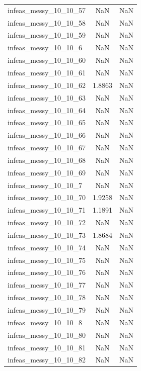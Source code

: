 \begin{longtable}{lcc}
infeas\_messy\_10\_10\_57  &      NaN &     NaN \\
infeas\_messy\_10\_10\_58  &      NaN &     NaN \\
infeas\_messy\_10\_10\_59  &      NaN &     NaN \\
infeas\_messy\_10\_10\_6   &      NaN &     NaN \\
infeas\_messy\_10\_10\_60  &      NaN &     NaN \\
infeas\_messy\_10\_10\_61  &      NaN &     NaN \\
infeas\_messy\_10\_10\_62  &   1.8863 &     NaN \\
infeas\_messy\_10\_10\_63  &      NaN &     NaN \\
infeas\_messy\_10\_10\_64  &      NaN &     NaN \\
infeas\_messy\_10\_10\_65  &      NaN &     NaN \\
infeas\_messy\_10\_10\_66  &      NaN &     NaN \\
infeas\_messy\_10\_10\_67  &      NaN &     NaN \\
infeas\_messy\_10\_10\_68  &      NaN &     NaN \\
infeas\_messy\_10\_10\_69  &      NaN &     NaN \\
infeas\_messy\_10\_10\_7   &      NaN &     NaN \\
infeas\_messy\_10\_10\_70  &   1.9258 &     NaN \\
infeas\_messy\_10\_10\_71  &   1.1891 &     NaN \\
infeas\_messy\_10\_10\_72  &      NaN &     NaN \\
infeas\_messy\_10\_10\_73  &   1.8684 &     NaN \\
infeas\_messy\_10\_10\_74  &      NaN &     NaN \\
infeas\_messy\_10\_10\_75  &      NaN &     NaN \\
infeas\_messy\_10\_10\_76  &      NaN &     NaN \\
infeas\_messy\_10\_10\_77  &      NaN &     NaN \\
infeas\_messy\_10\_10\_78  &      NaN &     NaN \\
infeas\_messy\_10\_10\_79  &      NaN &     NaN \\
infeas\_messy\_10\_10\_8   &      NaN &     NaN \\
infeas\_messy\_10\_10\_80  &      NaN &     NaN \\
infeas\_messy\_10\_10\_81  &      NaN &     NaN \\
infeas\_messy\_10\_10\_82  &      NaN &     NaN \\

\end{longtable}
